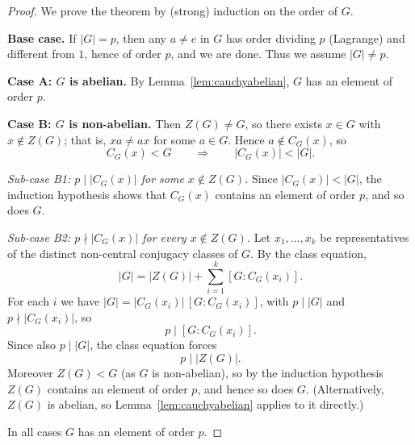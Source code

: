 \documentclass[11pt,a4paper]{article}
\begin{document}
	
	\begin{proof}
		We prove the theorem by (strong) induction on the order of $G$.
		
		\vspace{0.5em}
		\noindent \textbf{Base case.} If $|G| = p$, then any $a \neq e$ in $G$ has order dividing $p$ (Lagrange) and different from $1$, hence of order $p$, and we are done. Thus we assume $|G| \neq p$.
		
		\vspace{0.5em}
		\noindent \textbf{Case A: $G$ is abelian.} By Lemma~\ref{lem:cauchyabelian}, $G$ has an element of order $p$.
		
		\vspace{0.5em}
		\noindent \textbf{Case B: $G$ is non-abelian.} Then $Z(G) \neq G$, so there exists $x \in G$ with $x \notin Z(G)$; that is, $xa \neq ax$ for some $a \in G$. Hence $a \notin C_G(x)$, so
		\[
		C_G(x) < G \qquad \Longrightarrow \qquad |C_G(x)| < |G|.
		\]
		
		\vspace{0.5em}
		\noindent \emph{Sub-case B1: $p \mid |C_G(x)|$ for some $x \notin Z(G)$.} Since $|C_G(x)| < |G|$, the induction hypothesis shows that $C_G(x)$ contains an element of order $p$, and so does $G$.
		
		\vspace{0.5em}
		\noindent \emph{Sub-case B2: $p \nmid |C_G(x)|$ for every $x \notin Z(G)$.} Let $x_1, \dots, x_k$ be representatives of the distinct non-central conjugacy classes of $G$. By the class equation,
		\[
		|G| = |Z(G)| + \sum_{i=1}^{k} [G : C_G(x_i)].
		\]
		For each $i$ we have $|G| = |C_G(x_i)|\,[G : C_G(x_i)]$, with $p \mid |G|$ and $p \nmid |C_G(x_i)|$, so
		\[
		p \mid [G : C_G(x_i)].
		\]
		Since also $p \mid |G|$, the class equation forces
		\[
		p \mid |Z(G)|.
		\]
		Moreover $Z(G) < G$ (as $G$ is non-abelian), so by the induction hypothesis $Z(G)$ contains an element of order $p$, and hence so does $G$. (Alternatively, $Z(G)$ is abelian, so Lemma~\ref{lem:cauchyabelian} applies to it directly.)
		
		\vspace{0.5em}
		\noindent In all cases $G$ has an element of order $p$.
	\end{proof}
	
\end{document}
